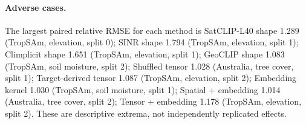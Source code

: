 \paragraph{Adverse cases.} The largest paired relative RMSE for each method is SatCLIP-L40 shape 1.289 (TropSAm, elevation, split 0); SINR shape 1.794 (TropSAm, elevation, split 1); Climplicit shape 1.651 (TropSAm, elevation, split 1); GeoCLIP shape 1.083 (TropSAm, soil moisture, split 2); Shuffled tensor 1.028 (Australia, tree cover, split 1); Target-derived tensor 1.087 (TropSAm, elevation, split 2); Embedding kernel 1.030 (TropSAm, soil moisture, split 1); Spatial + embedding 1.014 (Australia, tree cover, split 2); Tensor + embedding 1.178 (TropSAm, elevation, split 2). These are descriptive extrema, not independently replicated effects.
